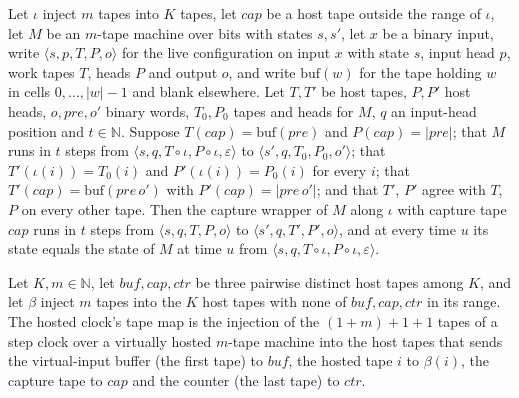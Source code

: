 \begin{theorem}
\label{Turing.NTimeDiag.dz_silent}
\leanok
{}
Let $\iota$ inject $m$ tapes into $K$ tapes, let $\mathit{cap}$ be a host tape outside the range of
$\iota$, let $M$ be an $m$-tape machine over bits with states $s, s'$, let $x$ be a binary input,
write $\langle s, p, T, P, o\rangle$ for the live configuration on input $x$ with state $s$, input
head $p$, work tapes $T$, heads $P$ and output $o$, and write $\mathrm{buf}(w)$ for the tape
holding $w$ in cells $0, \dots, |w| - 1$ and blank elsewhere. Let $T, T'$ be host tapes, $P, P'$
host heads, $o, \mathit{pre}, o'$ binary words, $T_0, P_0$ tapes and heads for $M$, $q$ an
input-head position and $t \in \mathbb{N}$. Suppose $T(\mathit{cap}) = \mathrm{buf}(\mathit{pre})$
and $P(\mathit{cap}) = |\mathit{pre}|$; that $M$ runs in $t$ steps from $\langle s, q, T \circ
\iota, P \circ \iota, \varepsilon\rangle$ to $\langle s', q, T_0, P_0, o'\rangle$; that
$T'(\iota(i)) = T_0(i)$ and $P'(\iota(i)) = P_0(i)$ for every $i$; that $T'(\mathit{cap}) =
\mathrm{buf}(\mathit{pre}\,o')$ with $P'(\mathit{cap}) = |\mathit{pre}\,o'|$; and that $T'$, $P'$
agree with $T$, $P$ on every other tape. Then the capture wrapper of $M$ along $\iota$ with capture
tape $\mathit{cap}$ runs in $t$ steps from $\langle s, q, T, P, o\rangle$ to $\langle s', q, T',
P', o\rangle$, and at every time $u$ its state equals the state of $M$ at time $u$ from $\langle s,
q, T \circ \iota, P \circ \iota, \varepsilon\rangle$.
\end{theorem}

\begin{definition}
\label{Turing.NTimeDiag.dzClkEmb}
\leanok
Let $K, m \in \mathbb{N}$, let $\mathit{buf}, \mathit{cap}, \mathit{ctr}$ be three pairwise
distinct host tapes among $K$, and let $\beta$ inject $m$ tapes into the $K$ host tapes with none
of $\mathit{buf}, \mathit{cap}, \mathit{ctr}$ in its range. The hosted clock's tape map is the
injection of the $(1 + m) + 1 + 1$ tapes of a step clock over a virtually hosted $m$-tape machine
into the host tapes that sends the virtual-input buffer (the first tape) to $\mathit{buf}$, the
hosted tape $i$ to $\beta(i)$, the capture tape to $\mathit{cap}$ and the counter (the last tape)
to $\mathit{ctr}$.
\end{definition}

